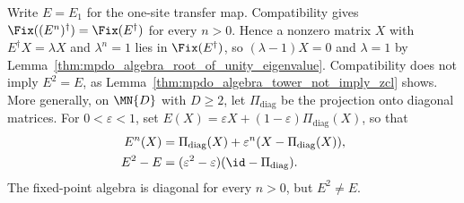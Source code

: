 \begin{remark}%
    \label{rem:mpdo_algebra_tower_to_zcl_gap}
    Write $E=E_1$ for the one-site transfer map. Compatibility gives
    $\Fix((E^n)^\dagger)=\Fix(E^\dagger)$ for every $n>0$.
    Hence a nonzero matrix $X$ with $E^\dagger X=\lambda X$ and
    $\lambda^n=1$ lies in $\Fix(E^\dagger)$, so $(\lambda-1)X=0$ and
    $\lambda=1$ by
    Lemma~\ref{thm:mpdo_algebra_root_of_unity_eigenvalue}. Compatibility does
    not imply $E^2=E$, as
    Lemma~\ref{thm:mpdo_algebra_tower_not_imply_zcl} shows. More
    generally, on $\MN{D}$ with $D\ge2$, let $\Pi_{\mathrm{diag}}$ be the
    projection onto diagonal matrices. For $0<\varepsilon<1$, set
    $E(X)=\varepsilon X+(1-\varepsilon)\Pi_{\mathrm{diag}}(X)$, so that
    \begin{align}
        E^n(X)
         & = \Pi_{\mathrm{diag}}(X)
        + \varepsilon^n(X-\Pi_{\mathrm{diag}}(X)),
        \notag                           \\
        E^2-E
         & = (\varepsilon^2-\varepsilon)
        (\id-\Pi_{\mathrm{diag}}).
        \notag
    \end{align}
    The fixed-point algebra is diagonal for every $n>0$, but $E^2\ne E$.


\end{remark}
